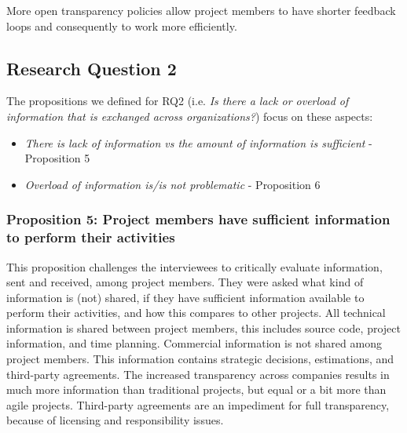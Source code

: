  More open transparency policies allow project members to have shorter feedback loops and consequently to work more efficiently.

\subsection{Research Question 2}\label{sec:ResearchQuestion2}

The propositions we defined for  
RQ2 (i.e. {\em Is there a lack or overload of information that is exchanged across organizations?}) focus on these aspects:

\begin{itemize}
\item {\em There is lack of information vs %
{the amount of information is sufficient}} - Proposition 5 %
\item {\em Overload of information is/is not problematic} - Proposition 6
\end{itemize}

\vspace{.2cm}
\subsubsection{Proposition 5: Project members have sufficient information to perform their activities}

%
%
%

This proposition challenges the interviewees to critically evaluate information, sent and received, among project members. They were asked what kind of information is (not) shared, if they have sufficient information available to perform their activities, and how this compares to other projects. All technical information is shared between project members, this includes source code, project information, and time planning. Commercial information is not shared among project members. This information contains strategic decisions, estimations, and third-party agreements. The increased transparency across companies results in much more information than traditional projects, but equal or a bit more than agile projects. Third-party agreements are an impediment for full transparency, because of licensing and responsibility issues.

